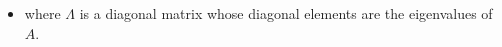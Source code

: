\begin{frame}
{\begin{itemize}
{\begin{equation*}
\begin{aligned}
{\begin{bmatrix}
                    \end{bmatrix} \\}
                  \onslide<6->{   & =                 %
                    \begin{bmatrix}
                      \overset{\big\uparrow}{\underset{\big\downarrow}{\lambda_1 u_1}}
                       & %
                      \overset{\big\uparrow}{\underset{\big\downarrow}{\lambda_2 u_2}}
                       &
                      \dots
                       &
                      \overset{\big\uparrow}{\underset{\big\downarrow}{\lambda_n u_n}}
                    \end{bmatrix} \\}
                  \onslide<7->{   & =                 %
                    \begin{bmatrix}
                      \overset{\big\uparrow}{\underset{\big\downarrow}{u_1}}
                       &
                      \overset{\big\uparrow}{\underset{\big\downarrow}{u_2}}
                       &
                      \dots
                       &
                      \overset{\big\uparrow}{\underset{\big\downarrow}{u_n}}
                    \end{bmatrix}}
                  \onslide<8->{\left[
                      \begin{array}{ccccc}
                        \lambda_1 & 0         & \dots    & 0         \\
                              0   & \lambda_2 &          & \vdots         \\
                           \vdots &           & \ddots   & 0         \\
                              0   &   \hdots  &  0       & \lambda_n
                      \end{array}
                      \right]}
                  \onslide<9->{   & = U\Lambda}
                \end{aligned}
              \end{equation*}
            }
      \item<10-> where $\Lambda$ is a diagonal matrix whose diagonal elements are the eigenvalues
            of $A$.
    \end{itemize}
  }
\end{frame}

